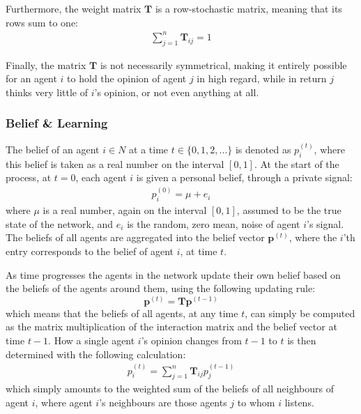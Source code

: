 \documentclass{article}
\newcommand{\T}{\textbf{T}}
\newcommand{\Tij}{\textbf{T}_{ij}}
\newcommand{\beli}[3][2]{p_{#2}^{(#3)}}
\begin{document}
Furthermore, the weight matrix $\T$ is a row-stochastic matrix, meaning that its rows sum to one:
\begin{align*}
    \sum_{j=1}^{n} \Tij = 1
\end{align*}

Finally, the matrix $\T$ is not necessarily symmetrical, making it entirely possible for an agent $i$ to hold the opinion of agent $j$ in high regard, while in return $j$ thinks very little of $i$'s opinion, or not even anything  at all.

\newpage

\subsubsection{Belief \& Learning}
\label{beliefs}

The belief of an agent $i \in N$ at a time $t \in \{0, 1, 2, ...\}$ is denoted as $p_{i}^{(t)}$, where this belief is taken as a real number on the interval $[0, 1]$. At the start of the process, at $t=0$, each agent $i$ is given a personal belief, through a private signal:
\begin{align*}
    \beli{i}{0} = \mu + e_i
\end{align*}
where $\mu$ is a real number, again on the interval $[0, 1]$, assumed to be the true state of the network, and $e_i$ is the random, zero mean, noise of agent $i$'s signal. \newline
The beliefs of all agents are aggregated into the belief vector $\textbf{p}^{(t)}$, where the $i$'th entry corresponds to the belief of agent $i$, at time $t$.

As time progresses the agents in the network update their own belief based on the beliefs of the agents around them, using the following updating rule:
\begin{equation}
    \label{updating:standard}
    \textbf{p}^{(t)} = \T\textbf{p}^{(t-1)}
\end{equation}
which means that the beliefs of all agents, at any time $t$, can simply be computed as the matrix multiplication of the interaction matrix and the belief vector at time $t-1$. How a single agent $i$'s opinion changes from $t-1$ to $t$ is then determined with the following calculation:
\begin{align*}
    \beli{i}{t} = \sum_{j=1}^{n}\Tij\beli{j}{t-1}
\end{align*}
which simply amounts to the weighted sum of the beliefs of all neighbours of agent $i$, where agent $i$'s neighbours are those agents $j$ to whom $i$ listens.
\end{document}

